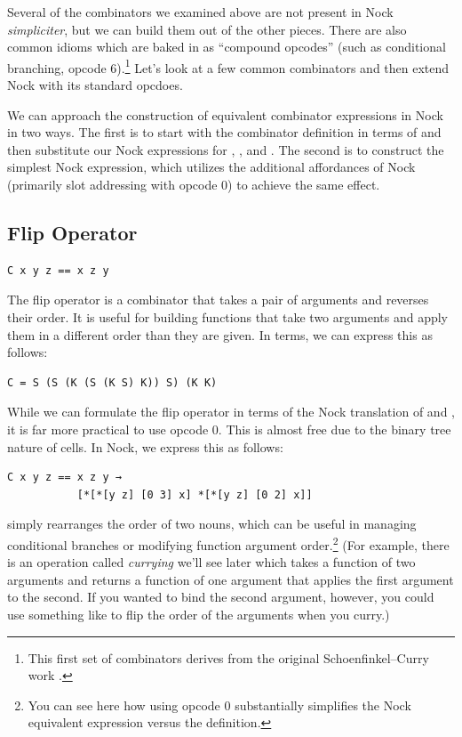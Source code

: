 Several of the combinators we examined above are not present in Nock \emph{simpliciter}, but we can build them out of the other pieces.  There are also common idioms which are baked in as ``compound opcodes'' (such as conditional branching, opcode 6).\footnote{This first set of combinators derives from the original Schoenfinkel--Curry work \citep{Curry1930}.}  Let's look at a few common combinators and then extend Nock with its standard opcdoes.

We can approach the construction of equivalent combinator expressions in Nock in two ways.  The first is to start with the combinator definition in terms of  and then substitute our Nock expressions for , , and .  The second is to construct the simplest Nock expression, which utilizes the additional affordances of Nock (primarily slot addressing with opcode 0) to achieve the same effect.

\subsection{ Flip Operator}

\begin{lstlisting}[style=listingcomb,frame=tb]
C x y z == x z y
\end{lstlisting}

The flip operator  is a combinator that takes a pair of arguments and reverses their order.  It is useful for building functions that take two arguments and apply them in a different order than they are given.  In  terms, we can express this as follows:

\begin{lstlisting}[style=listingcomb,frame=tb]
C = S (S (K (S (K S) K)) S) (K K)
\end{lstlisting}

While we can formulate the flip operator  in terms of the Nock translation of  and , it is far more practical to use opcode 0.  This is almost free due to the binary tree nature of cells.  In Nock, we express this as follows:

\begin{lstlisting}[style=listingcode]
C x y z == x z y →
           [*[*[y z] [0 3] x] *[*[y z] [0 2] x]]
\end{lstlisting}

\noindent
{} simply rearranges the order of two nouns, which can be useful in managing conditional branches or modifying function argument order.\footnote{You can see here how using opcode 0 substantially simplifies the Nock equivalent expression versus the  definition.}  (For example, there is an operation called \emph{currying} we'll see later which takes a function of two arguments and returns a function of one argument that applies the first argument to the second.  If you wanted to bind the second argument, however, you could use something like  to flip the order of the arguments when you curry.)

